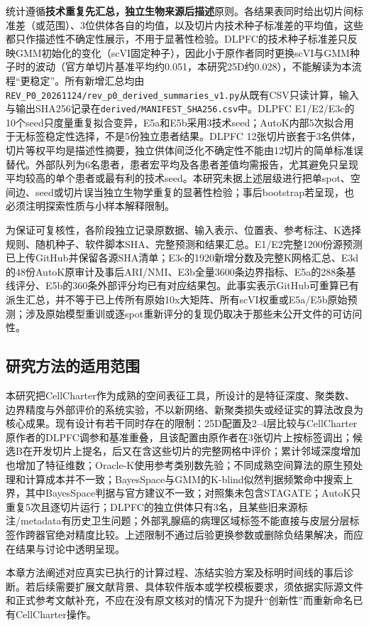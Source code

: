 统计遵循\textbf{技术重复先汇总，独立生物来源后描述}原则。各结果表同时给出切片间标准差（或范围）、3位供体各自的均值，以及切片内技术种子标准差的平均值，这些都只作描述性不确定性展示，不用于显著性检验。DLPFC的技术种子标准差只反映GMM初始化的变化（scVI固定种子），因此小于原作者同时更换scVI与GMM种子时的波动（官方单切片基准平均约0.051，本研究25D约0.028），不能解读为本流程“更稳定”。所有新增汇总均由\texttt{REV\_P0\_20261124/rev\_p0\_derived\_summaries\_v1.py}从既有CSV只读计算，输入与输出SHA256记录在\texttt{derived/MANIFEST\_SHA256.csv}中。DLPFC E1/E2/E3c的10个seed只度量重复拟合变异，E5a和E5b采用3技术seed；AutoK内部5次拟合用于无标签稳定性选择，不是5份独立患者结果。DLPFC 12张切片嵌套于3名供体，切片等权平均是描述性摘要，独立供体间泛化不确定性不能由12切片的简单标准误替代。外部队列为6名患者，患者宏平均及各患者差值均需报告，尤其避免只呈现平均较高的单个患者或最有利的技术seed。本研究未据上述层级进行把单spot、空间边、seed或切片误当独立生物学重复的显著性检验；事后bootstrap若呈现，也必须注明探索性质与小样本解释限制。

为保证可复核性，各阶段独立记录原数据、输入表示、位置表、参考标注、K选择规则、随机种子、软件脚本SHA、完整预测和结果汇总。E1/E2完整1200份源预测已上传GitHub并保留各源SHA清单；E3c的1920新增分数及完整K网格汇总、E3d的48份AutoK原审计及事后ARI/NMI、E3b全量3600条边界指标、E5a的288条基线评分、E5b的360条外部评分均已有对应结果包。此事实表示GitHub可重算已有派生汇总，并不等于已上传所有原始10x大矩阵、所有scVI权重或E5a/E5b原始预测；涉及原始模型重训或逐spot重新评分的复现仍取决于那些未公开文件的可访问性。

\subsection{研究方法的适用范围}
\label{subsec:cc-method-limits-v1}

本研究把CellCharter作为成熟的空间表征工具，所设计的是特征深度、聚类数、边界精度与外部评价的系统实验，不以新网络、新聚类损失或经证实的算法改良为核心成果。现有设计有若干同时存在的限制：25D配置及2--4层比较与CellCharter原作者的DLPFC调参和基准重叠，且该配置由原作者在3张切片上按标签调出；候选B在开发切片上提名，后又在含这些切片的完整网格中评价；累计邻域深度增加也增加了特征维数；Oracle-K使用参考类别数先验；不同成熟空间算法的原生预处理和计算成本并不一致；BayesSpace与GMM的K-blind似然判据频繁命中搜索上界，其中BayesSpace判据与官方建议不一致；对照集未包含STAGATE；AutoK只重复5次且逐切片运行；DLPFC的独立供体只有3名，且某些旧来源标注/metadata有历史卫生问题；外部乳腺癌的病理区域标签不能直接与皮层分层标签作跨器官绝对精度比较。上述限制不通过后验更换参数或删除负结果解决，而应在结果与讨论中透明呈现。

本章方法阐述对应真实已执行的计算过程、冻结实验方案及标明时间线的事后诊断。若后续需要扩展文献背景、具体软件版本或学校模板要求，须依据实际源文件和正式参考文献补充，不应在没有原文核对的情况下为提升“创新性”而重新命名已有CellCharter操作。
